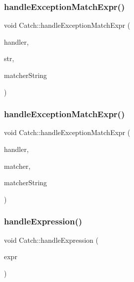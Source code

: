 \subsubsection{\texorpdfstring{handle\+Exception\+Match\+Expr()}{handleExceptionMatchExpr()}\hspace{0.1cm}{\footnotesize\ttfamily [1/2]}}
{\footnotesize\ttfamily void Catch\+::handle\+Exception\+Match\+Expr (\begin{DoxyParamCaption}\item[{\mbox{\hyperlink{class_catch_1_1_assertion_handler}{Assertion\+Handler}} \&}]{handler,  }\item[{std\+::string const \&}]{str,  }\item[{\mbox{\hyperlink{class_catch_1_1_string_ref}{String\+Ref}} const \&}]{matcher\+String }\end{DoxyParamCaption})}

\mbox{\label{namespace_catch_a3a96a82307107087642e22fc4be5844d}} 
\subsubsection{\texorpdfstring{handle\+Exception\+Match\+Expr()}{handleExceptionMatchExpr()}\hspace{0.1cm}{\footnotesize\ttfamily [2/2]}}
{\footnotesize\ttfamily void Catch\+::handle\+Exception\+Match\+Expr (\begin{DoxyParamCaption}\item[{\mbox{\hyperlink{class_catch_1_1_assertion_handler}{Assertion\+Handler}} \&}]{handler,  }\item[{\mbox{\hyperlink{namespace_catch_aba438977e831821a2eeca82b9b4f4af2}{String\+Matcher}} const \&}]{matcher,  }\item[{\mbox{\hyperlink{class_catch_1_1_string_ref}{String\+Ref}} const \&}]{matcher\+String }\end{DoxyParamCaption})}

\mbox{\label{namespace_catch_a65af25091f2ab61056e166765963e525}} 
\subsubsection{\texorpdfstring{handle\+Expression()}{handleExpression()}\hspace{0.1cm}{\footnotesize\ttfamily [1/2]}}
{\footnotesize\ttfamily void Catch\+::handle\+Expression (\begin{DoxyParamCaption}\item[{\mbox{\hyperlink{struct_catch_1_1_i_transient_expression}{I\+Transient\+Expression}} const \&}]{expr }\end{DoxyParamCaption})}

